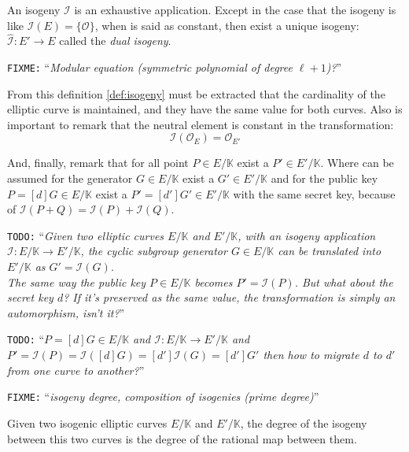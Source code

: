 \documentclass[10pt,a4paper,twoside]{llncs}
\newcommand{\todo}[1]{\texttt{\color{red}TODO:} ``\emph{#1}''}
\newcommand{\fixme}[1]{\texttt{\color{red}FIXME:} ``\emph{#1}''}
\newcommand{\PaIe}{\ensuremath{\mathcal{O}_{E}}}%
\begin{document}
An isogeny $\mathcal{I}$ is an exhaustive application. Except in the case that the isogeny is like $\mathcal{I}(E)=\{\mathcal{O}\}$, when is said as constant, then exist a unique isogeny: $\widehat{\mathcal{I}}:E' \rightarrow E$ called the \emph{dual isogeny}.

\fixme{Modular equation (symmetric polynomial of degree $\ell+1$)?}

From this definition \ref{def:isogeny} must be extracted that the cardinality of the elliptic curve is maintained, and they have the same value for both curves. Also is important to remark that the neutral element is constant in the transformation:
 \begin{equation}\label{eq:isoPaI}
        \mathcal{I}\left(\PaIe\right) = \mathcal{O}_{E'}
\end{equation}

And, finally, remark that for all point $P \in E/\mathbb{K}$ exist a $P' \in E'/\mathbb{K}$. Where can be assumed for the generator $G \in E/\mathbb{K}$ exist a $G' \in E'/\mathbb{K}$ and for the public key $P=[d]G \in E/\mathbb{K}$ exist a $P'=[d']G' \in E'/\mathbb{K}$ with the same secret key, because of $\mathcal{I}\left(P+Q\right) = \mathcal{I}\left(P\right)+\mathcal{I}\left(Q\right)$.

\todo{Given two elliptic curves $E/\mathbb{K}$ and $E'/\mathbb{K}$, with an isogeny application $\mathcal{I}: E/\mathbb{K} \rightarrow E'/\mathbb{K}$, the cyclic subgroup generator $G \in E/\mathbb{K}$ can be \emph{translated} into $E'/\mathbb{K}$ as $G'=\mathcal{I}\left(G\right)$.\\ The same way the public key $P \in E/\mathbb{K}$ becomes $P'=\mathcal{I}\left(P\right)$. But what about the secret key $d$? If it's preserved as the same value, the transformation is simply an automorphism, isn't it?}

\todo{$P=[d]G \in E/\mathbb{K}$ and $\mathcal{I}: E/\mathbb{K} \rightarrow E'/\mathbb{K}$ and  $P'=\mathcal{I}\left(P\right)=\mathcal{I}\left([d]G\right)=[d']\mathcal{I}\left(G\right)=[d']G'$ then how to \emph{migrate} $d$ to $d'$ from one curve to another?}

\fixme{isogeny degree, composition of isogenies (prime degree)}

\begin{definition}\label{def:iso_degree}
 Given two isogenic elliptic curves $E/\mathbb{K}$ and $E'/\mathbb{K}$, the degree of the isogeny between this two curves is the degree of the rational map between them.
\end{definition}
\end{document}
